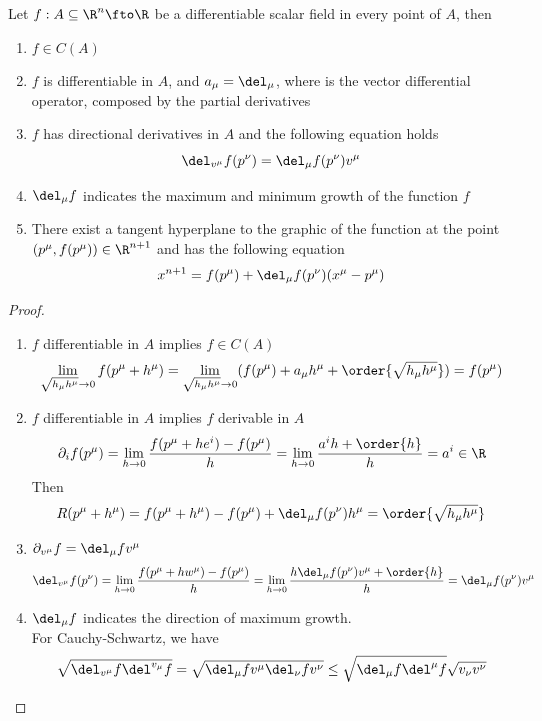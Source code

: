 \documentclass[../mmf.tex]{subfiles}
\begin{document}
\begin{thm}
	Let $f:A\subseteq\R^n\fto\R$ be a differentiable scalar field in every point of $A$, then
	\begin{enumerate}
	\item $f\in C(A)$
	\item $f$ is differentiable in $A$, and $a_\mu=\del_\mu$, where is the vector differential operator, composed by the partial derivatives
	\item $f$ has directional derivatives in $A$ and the following equation holds
		\begin{equation*}
			\del_{v^\mu}f(p^\nu)=\del_\mu f(p^\nu)v^\mu
		\end{equation*}
	\item $\del_\mu{f}$ indicates the maximum and minimum growth of the function $f$
	\item There exist a tangent hyperplane to the graphic of the function at the point $(p^\mu,f(p^\mu))\in\R^{n+1}$ and has the following equation
		\begin{equation*}
			x^{n+1}=f(p^\mu)+\del_\mu f(p^\nu)(x^\mu-p^\mu)
		\end{equation*}
	\end{enumerate}
\end{thm}
\begin{proof}
	\begin{enumerate}
	\item $f$ differentiable in $A$ implies $f\in C(A)$
		\begin{equation*}
			\lim_{\sqrt{h_\mu h^\mu}\to0}f(p^\mu+h^\mu)=\lim_{\sqrt{h_\mu h^\mu}\to0}(f(p^\mu)+a_\mu h^\mu+\order{\sqrt{h_\mu h^\mu}})=f(p^\mu)
		\end{equation*}
	\item $f$ differentiable in $A$ implies $f$ derivable in $A$
		\begin{equation*}
			\partial_i f(p^\mu)=\lim_{h\to0}\frac{f(p^\mu+he^i)-f(p^\mu)}{h}=\lim_{h\to0}\frac{a^ih+\order{h}}{h}=a^i\in\R
		\end{equation*}
		Then
		\begin{equation*}
			R(p^\mu+h^\mu)=f(p^\mu+h^\mu)-f(p^\mu)+\del_\mu f(p^\nu)h^\mu=\order{\sqrt{h_\mu h^\mu}}
		\end{equation*}
	\item $\partial_{v^\mu}f=\del_\mu fv^\mu$
		\begin{equation*}
			\del_{v^\mu}f(p^\nu)=\lim_{h\to0}\frac{f(p^\mu+hw^\mu)-f(p^\mu)}{h}=\lim_{h\to0}\frac{h\del_\mu f(p^\nu)v^\mu+\order{h}}{h}=\del_\mu f(p^\nu)v^\mu
		\end{equation*}
	\item $\del_\mu f$ indicates the direction of maximum growth.\\
		For Cauchy-Schwartz, we have
		\begin{equation*}
			\sqrt{\del_{v^\mu}{f}\del^{v_\mu}f}=\sqrt{\del_\mu fv^\mu \del_\nu fv^\nu}\le\sqrt{\del_\mu f\del^\mu f}\sqrt{v_\nu v^\nu}
		\end{equation*}
	\end{enumerate}
\end{proof}
\end{document}
